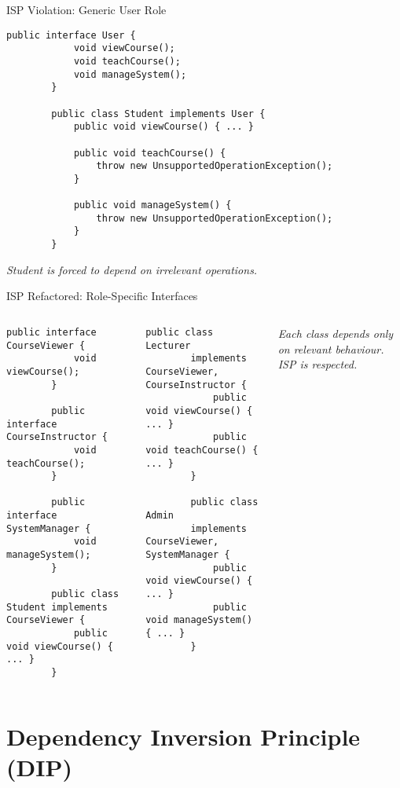\documentclass[aspectratio=169, table]{beamer}
\begin{document}
\begin{frame}[fragile]{ISP Violation: Generic User Role}
	\vspace{20pt}
	\begin{lstlisting}[style=JavaStyle]
		public interface User {
			void viewCourse();
			void teachCourse();
			void manageSystem();
		}
		
		public class Student implements User {
			public void viewCourse() { ... }
			
			public void teachCourse() {
				throw new UnsupportedOperationException();
			}
			
			public void manageSystem() {
				throw new UnsupportedOperationException();
			}
		}
	\end{lstlisting}
	\textit{Student is forced to depend on irrelevant operations.}
\end{frame}

\begin{frame}[fragile]{ISP Refactored: Role-Specific Interfaces}
	\vspace{20pt}
\begin{columns}[t]
	\begin{lstlisting}[style=JavaStyle]
		public interface CourseViewer {
			void viewCourse();
		}
		
		public interface CourseInstructor {
			void teachCourse();
		}
		
		public interface SystemManager {
			void manageSystem();
		}
		
		public class Student implements CourseViewer {
			public void viewCourse() { ... }
		}
	\end{lstlisting}
	
	\begin{lstlisting}[style=JavaStyle,  firstnumber=16]
		public class Lecturer 
		implements CourseViewer, CourseInstructor {
			public void viewCourse() { ... }
			public void teachCourse() { ... }
		}
		
		public class Admin 
		implements CourseViewer, SystemManager {
			public void viewCourse() { ... }
			public void manageSystem() { ... }
		}
	\end{lstlisting}
	\textit{Each class depends only on relevant behaviour. ISP is respected.}
\end{columns}

\end{frame}

\section{Dependency Inversion Principle (DIP)}
\end{document}
